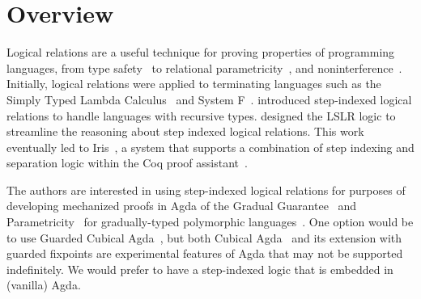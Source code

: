 \documentclass[acmsmall]{acmart}
\begin{document}



\maketitle


\clearpage

\tableofcontents

\section{Overview}
\label{sec:intro}

Logical relations are a useful technique for proving properties of
programming languages, from type safety~\citep{Timany:2022aa} to
relational parametricity~\citep{REYNOLDS83}, and
noninterference~\citep{heintze1998slam}.  Initially, logical relations
were applied to terminating languages such as the Simply Typed Lambda
Calculus~\citep{Tait:1967aa} and System F~\citep{GIRARD72}.
\citet{Appel:2001aa} introduced step-indexed logical relations to
handle languages with recursive types.  \citet{Dreyer:2011wl} designed
the LSLR logic to streamline the reasoning about step indexed logical
relations.  This work eventually led to Iris~\citep{JUNG:2018aa}, a
system that supports a combination of step indexing and separation
logic within the Coq proof
assistant~\citep{The-Coq-Development-Team:2004kf,Huet:2016aa}.

The authors are interested in using step-indexed logical relations for
purposes of developing mechanized proofs in Agda of the Gradual
Guarantee~\citep{Siek:2015ac} and Parametricity~\citep{REYNOLDS74C}
for gradually-typed polymorphic
languages~\citep{Ahmed:2011fk,Ahmed:2017aa,Igarashi:2017aa,New:2019ab,Labrada:2020tk}. One
option would be to use Guarded Cubical Agda~\citep{Veltri:2020aa}, but
both Cubical Agda~\citep{Vezzosi:2019aa} and its extension with
guarded fixpoints are experimental features of Agda that may not be
supported indefinitely.  We would prefer to have a step-indexed logic
that is embedded in (vanilla) Agda.
\end{document}
